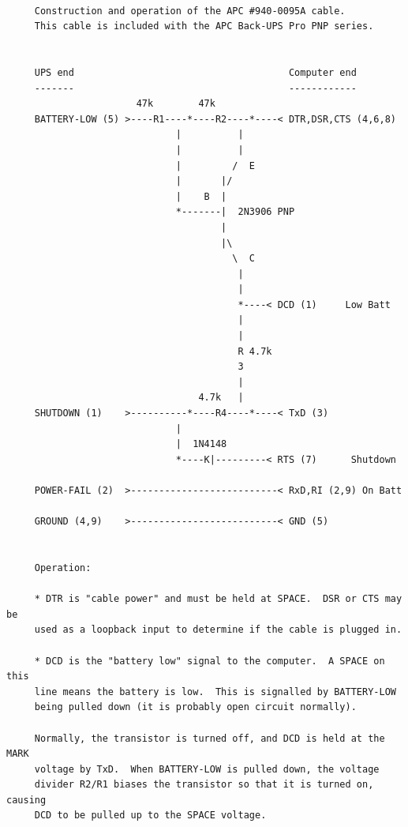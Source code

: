 \footnotesize
\begin{verbatim}
     
     Construction and operation of the APC #940-0095A cable.
     This cable is included with the APC Back-UPS Pro PNP series.
     
     
     UPS end                                      Computer end
     -------                                      ------------
                       47k        47k
     BATTERY-LOW (5) >----R1----*----R2----*----< DTR,DSR,CTS (4,6,8)
                              |          |
                              |          |
                              |         /  E
                              |       |/
                              |    B  |
                              *-------|  2N3906 PNP
                                      |
                                      |\
                                        \  C
                                         |
                                         |
                                         *----< DCD (1)     Low Batt
                                         |
                                         |
                                         R 4.7k
                                         3
                                         |
                                  4.7k   |
     SHUTDOWN (1)    >----------*----R4----*----< TxD (3)
                              |
                              |  1N4148
                              *----K|---------< RTS (7)      Shutdown
     
     POWER-FAIL (2)  >--------------------------< RxD,RI (2,9) On Batt
     
     GROUND (4,9)    >--------------------------< GND (5)
     
     
     Operation:
     
     * DTR is "cable power" and must be held at SPACE.  DSR or CTS may be
     used as a loopback input to determine if the cable is plugged in.
     
     * DCD is the "battery low" signal to the computer.  A SPACE on this
     line means the battery is low.  This is signalled by BATTERY-LOW
     being pulled down (it is probably open circuit normally).
     
     Normally, the transistor is turned off, and DCD is held at the MARK
     voltage by TxD.  When BATTERY-LOW is pulled down, the voltage
     divider R2/R1 biases the transistor so that it is turned on, causing
     DCD to be pulled up to the SPACE voltage.
     

\end{verbatim}
